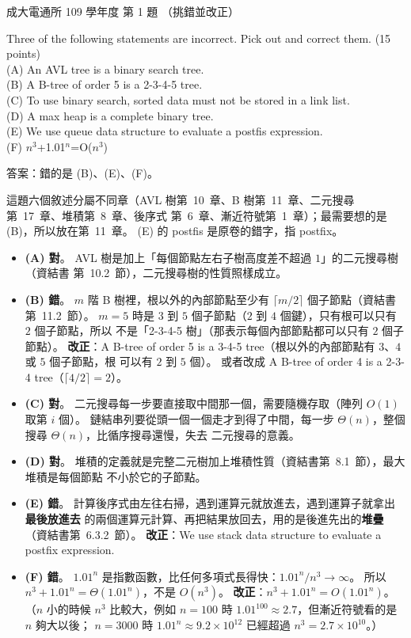 \begin{pastexam}[label={px:ncku-109-comm-ds-01}]{成大電通所 109 學年度 第 1 題}
（挑錯並改正）

Three of the following statements are incorrect. Pick out and correct them. (15 points)\\
(A) An AVL tree is a binary search tree.\\
(B) A B-tree of order 5 is a 2-3-4-5 tree.\\
(C) To use binary search, sorted data must not be stored in a link list.\\
(D) A max heap is a complete binary tree.\\
(E) We use queue data structure to evaluate a postfis expression.\\
(F) $n^3$+1.01$^n$=O($n^3$)
\end{pastexam}

\begin{pastsoln}
答案：錯的是 (B)、(E)、(F)。

這題六個敘述分屬不同章（AVL 樹第~10~章、B 樹第~11~章、二元搜尋第~17~章、堆積第~8~章、後序式
第~6~章、漸近符號第~1~章）；最需要想的是 (B)，所以放在第~11~章。 (E) 的 postfis 是原卷的錯字，指
postfix。

\begin{itemize}
\item \textbf{(A) 對}。 AVL 樹是加上「每個節點左右子樹高度差不超過 $1$」的二元搜尋樹（資結書
第~10.2~節），二元搜尋樹的性質照樣成立。
\item \textbf{(B) 錯}。 $m$ 階 B 樹裡，根以外的內部節點至少有 $\lceil m/2 \rceil$ 個子節點（資結書
第~11.2~節）。 $m = 5$ 時是 $3$ 到 $5$ 個子節點（$2$ 到 $4$ 個鍵），只有根可以只有 $2$ 個子節點，所以
不是「2-3-4-5 樹」（那表示每個內部節點都可以只有 $2$ 個子節點）。
\textbf{改正}：A B-tree of order 5 is a 3-4-5 tree（根以外的內部節點有 $3$、$4$ 或 $5$ 個子節點，根
可以有 $2$ 到 $5$ 個）。 或者改成 A B-tree of order 4 is a 2-3-4 tree（$\lceil 4/2 \rceil = 2$）。
\item \textbf{(C) 對}。 二元搜尋每一步要直接取中間那一個，需要隨機存取（陣列 $O(1)$ 取第 $i$ 個）。
鏈結串列要從頭一個一個走才到得了中間，每一步 $\Theta(n)$，整個搜尋 $\Theta(n)$，比循序搜尋還慢，失去
二元搜尋的意義。
\item \textbf{(D) 對}。 堆積的定義就是完整二元樹加上堆積性質（資結書第~8.1~節），最大堆積是每個節點
不小於它的子節點。
\item \textbf{(E) 錯}。 計算後序式由左往右掃，遇到運算元就放進去，遇到運算子就拿出\textbf{最後放進去}
的兩個運算元計算、再把結果放回去，用的是後進先出的\textbf{堆疊}（資結書第~6.3.2~節）。
\textbf{改正}：We use stack data structure to evaluate a postfix expression.
\item \textbf{(F) 錯}。 $1.01^n$ 是指數函數，比任何多項式長得快：$1.01^n / n^3 \to \infty$。 所以
$n^3 + 1.01^n = \Theta(1.01^n)$，不是 $O(n^3)$。 \textbf{改正}：$n^3 + 1.01^n = O(1.01^n)$。 （$n$ 小的時候
$n^3$ 比較大，例如 $n = 100$ 時 $1.01^{100} \approx 2.7$，但漸近符號看的是 $n$ 夠大以後；
$n = 3000$ 時 $1.01^n \approx 9.2 \times 10^{12}$ 已經超過 $n^3 = 2.7 \times 10^{10}$。）
\end{itemize}
\end{pastsoln}
